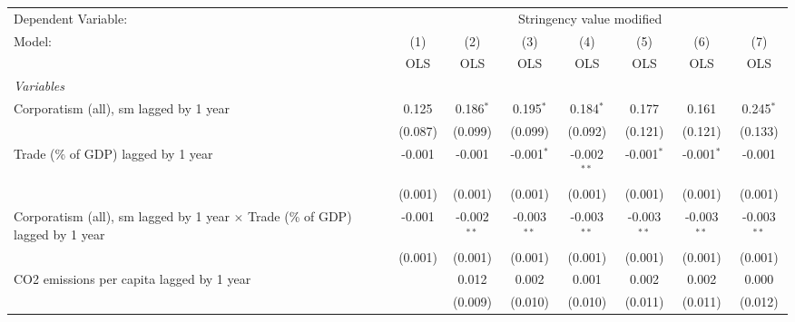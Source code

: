 
\begingroup
\centering
\begin{tabular}{lccccccc}
   \toprule
   Dependent Variable: & \multicolumn{7}{c}{Stringency value modified}\\
   Model:                                                                               & (1)     & (2)           & (3)           & (4)           & (5)           & (6)           & (7)\\  
                                                                                        &  OLS    & OLS           & OLS           & OLS           & OLS           & OLS           & OLS\\  
   \midrule
   \emph{Variables}\\
   Corporatism (all), sm lagged by 1 year                                               & 0.125   & 0.186$^{*}$   & 0.195$^{*}$   & 0.184$^{*}$   & 0.177         & 0.161         & 0.245$^{*}$\\   
                                                                                        & (0.087) & (0.099)       & (0.099)       & (0.092)       & (0.121)       & (0.121)       & (0.133)\\   
   Trade (\% of GDP) lagged by 1 year                                                   & -0.001  & -0.001        & -0.001$^{*}$  & -0.002$^{**}$ & -0.001$^{*}$  & -0.001$^{*}$  & -0.001\\   
                                                                                        & (0.001) & (0.001)       & (0.001)       & (0.001)       & (0.001)       & (0.001)       & (0.001)\\   
   Corporatism (all), sm lagged by 1 year $\times$ Trade (\% of GDP) lagged by 1 year   & -0.001  & -0.002$^{**}$ & -0.003$^{**}$ & -0.003$^{**}$ & -0.003$^{**}$ & -0.003$^{**}$ & -0.003$^{**}$\\   
                                                                                        & (0.001) & (0.001)       & (0.001)       & (0.001)       & (0.001)       & (0.001)       & (0.001)\\   
   CO2 emissions per capita lagged by 1 year                                            &         & 0.012         & 0.002         & 0.001         & 0.002         & 0.002         & 0.000\\   
                                                                                        &         & (0.009)       & (0.010)       & (0.010)       & (0.011)       & (0.011)       & (0.012)\\   

\end{tabular}
